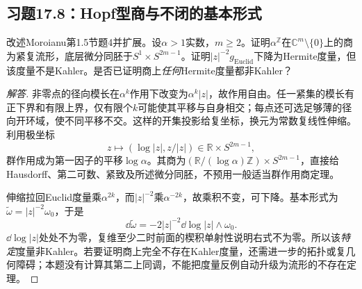 \subsection*{习题17.8：Hopf型商与不闭的基本形式}
改述Moroianu第1.5节题4并扩展。设$\alpha>1$实数，$m\geq2$。证明$\alpha^\mathbb Z$在$\mathbb C^m\setminus\{0\}$上的商为紧复流形，底层微分同胚于$S^1\times S^{2m-1}$。证明$|z|^{-2}g_{\mathrm{Euclid}}$下降为Hermite度量，但该度量不是Kahler。是否已证明商上\emph{任何}Hermite度量都非Kahler？
\begin{proof}[解答]
非零点的径向模长在$\alpha^k$作用下改变为$\alpha^k|z|$，故作用自由。任一紧集的模长有正下界和有限上界，仅有限个$k$可能使其平移与自身相交；每点还可选足够薄的径向开环域，使不同平移不交。这样的开集投影给复坐标，换元为常数复线性伸缩。利用极坐标
\[
 z\longmapsto(\log|z|,z/|z|)\in\mathbb R\times S^{2m-1},
\]
群作用成为第一因子的平移$\log\alpha$。其商为$(\mathbb R/(\log\alpha)\mathbb Z)\times S^{2m-1}$，直接给Hausdorff、第二可数、紧致及所述微分同胚，不预用一般适当群作用商定理。

伸缩拉回Euclid度量乘$\alpha^{2k}$，而$|z|^{-2}$乘$\alpha^{-2k}$，故乘积不变，可下降。基本形式为$\widetilde\omega=|z|^{-2}\omega_0$，于是
\[
 \dd\widetilde\omega=-2|z|^{-2}\dd\log|z|\wedge\omega_0.
\]
$\dd\log|z|$处处不为零，复维至少二时前面的楔积单射性说明右式不为零。所以该\emph{特定}度量非Kahler。若要证明商上完全不存在Kahler度量，还需进一步的拓扑或复几何障碍；本题没有计算其第二上同调，不能把度量反例自动升级为流形的不存在定理。
\end{proof}
